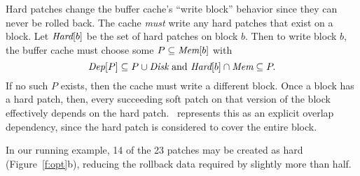 Hard patches change the buffer cache's ``write block'' behavior since they
can never be rolled back.
%
The cache \emph{must} write any hard patches that exist on a block.
%
Let $\PHard[b]$ be the set of hard patches on block $b$.
%
Then to write block $b$, the buffer cache must choose some $P \subseteq
\PMem[b]$ with
%
\[ \PDepset{P} \subseteq P \cup \PDisk \text{ and } \PHard[b] \cap \PMem
\subseteq P. \]
%
If no such $P$ exists, then the cache must write a different block.
%
Once a block has a hard patch, then, every succeeding soft patch on that
version of the block effectively depends on the hard patch.
%
\Kudos\ represents this as an explicit overlap dependency, since the hard
patch is considered to cover the entire block.


In our running example, 14 of the 23 patches may be created as hard
(Figure~\ref{f:opt}b),
%
reducing the rollback data required by slightly more than half.


